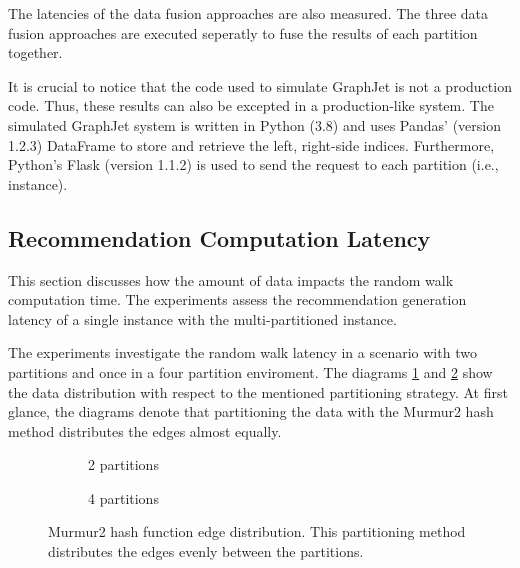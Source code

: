 The latencies of the data fusion approaches are also measured. The three data fusion approaches are executed seperatly to fuse the results of each partition together.


It is crucial to notice that the code used to simulate GraphJet is not a production code. Thus, these results can also be excepted in a production-like system. The simulated GraphJet system is written in Python (3.8) and uses Pandas' (version 1.2.3) DataFrame to store and retrieve the left, right-side indices. Furthermore, Python's Flask (version 1.1.2) is used to send the request to each partition (i.e., instance).


\subsection{Recommendation Computation Latency}
\label{subsec:recommendation-computation-latency}
This section discusses how the amount of data impacts the random walk computation time. The experiments assess the recommendation generation latency of a single instance with the multi-partitioned instance.


The experiments investigate the random walk latency in a scenario with two partitions and once in a four partition enviroment. The diagrams \ref{plot:edge-distribution-2-partitions-murmur2} and \ref{plot:edge-distribution-4-partitions-murmur2} show the data distribution with respect to the mentioned partitioning strategy. At first glance, the diagrams denote that partitioning the data with the Murmur2 hash method distributes the edges almost equally. 

\begin{figure}[!htb]
    \centering
    \begin{subfigure}[b]{0.8\textwidth}
        
        \caption{2 partitions}
        \label{plot:edge-distribution-2-partitions-murmur2}
    \end{subfigure}\qquad

    \begin{subfigure}[b]{0.8\textwidth}
        
        \caption{4 partitions}
        \label{plot:edge-distribution-4-partitions-murmur2}
    \end{subfigure}\qquad
    \caption{Murmur2 hash function edge distribution. This partitioning method distributes the edges evenly between the partitions.}
    \label{plot:edge-distirbution-murmur2}
\end{figure}



